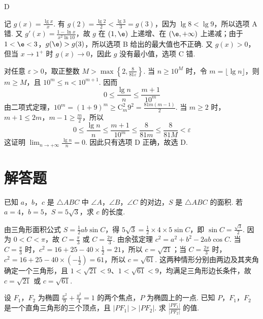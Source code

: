 \begin{answer}
D
\end{answer}

\begin{solution}
记 \(g(x)=\frac{\lg x}{x}\). 有 \(g(2)=\frac{\lg2}{2}<\frac{\lg3}{3}=g(3)\)，因为 \(\lg8<\lg9\)，所以选项 A 错. 又 \(g'(x)=\frac{1-\ln x}{x^2\ln10}\)，故 \(g\) 在 \((1,\e)\) 上递增、在 \((\e,+\infty)\) 上递减；由于 \(1<\e<3\)，\(g(\e)>g(3)\)，所以选项 B 给出的最大值也不正确. 又 \(g(x)>0\)，但当 \(x\to1^+\) 时 \(g(x)\to0\)，因此 \(g\) 没有最小值，选项 C 错.

对任意 \(\varepsilon>0\)，取正整数 \(M>\max\left\{2,\frac{8}{81\varepsilon}\right\}\). 当 \(n\geqslant10^M\) 时，令 \(m=\lfloor\lg n\rfloor\)，则 \(m\geqslant M\)，且 \(10^m\leqslant n<10^{m+1}\). 因而
\[
0\leqslant\frac{\lg n}{n}\leqslant\frac{m+1}{10^m}
\]
由二项式定理，\(10^m=(1+9)^m\geqslant\mathrm C_m^2 9^2=\frac{81m(m-1)}2\). 当 \(m\geqslant2\) 时，\(m+1\leqslant2m\)，\(m-1\geqslant\frac m2\)，所以
\[
0\leqslant\frac{\lg n}{n}\leqslant\frac{m+1}{10^m}\leqslant\frac{8}{81m}\leqslant\frac{8}{81M}<\varepsilon
\]
这证明 \(\displaystyle\lim_{n\to+\infty}\frac{\lg n}{n}=0\). 因此只有选项 D 正确，故选 D.
\end{solution}

\section{解答题}
\begin{problem}
已知 \(a\)，\(b\)，\(c\) 是 \(\triangle ABC\) 中 \(\angle A\)，\(\angle B\)，\(\angle C\) 的对边，\(S\) 是 \(\triangle ABC\) 的面积. 若 \(a=4\)，\(b=5\)，\(S=5\sqrt3\)，求 \(c\) 的长度.
\end{problem}

\begin{solution}
由三角形面积公式 \(S=\frac12ab\sin C\)，得 \(5\sqrt3=\frac12\times4\times5\sin C\)，即 \(\sin C=\frac{\sqrt3}{2}\). 因为 \(0<C<\pi\)，故 \(C=\frac\pi3\) 或 \(C=\frac{2\pi}3\). 由余弦定理 \(c^2=a^2+b^2-2ab\cos C\). 当 \(C=\frac\pi3\) 时，\(c^2=16+25-40\times\frac12=21\)，所以 \(c=\sqrt{21}\)；当 \(C=\frac{2\pi}3\) 时，\(c^2=16+25-40\times\left(-\frac12\right)=61\)，所以 \(c=\sqrt{61}\). 这两种情形分别由两边及其夹角确定一个三角形，且 \(1<\sqrt{21}<9\)、\(1<\sqrt{61}<9\)，均满足三角形边长条件，故 \(c=\sqrt{21}\) 或 \(c=\sqrt{61}\).
\end{solution}

\begin{problem}
设 \(F_1\)，\(F_2\) 为椭圆 \(\frac{x^2}{9}+\frac{y^2}{4}=1\) 的两个焦点，\(P\) 为椭圆上的一点. 已知 \(P\)，\(F_1\)，\(F_2\) 是一个直角三角形的三个顶点，且 \(|PF_1|>|PF_2|\). 求 \(\frac{|PF_1|}{|PF_2|}\) 的值.
\end{problem}

